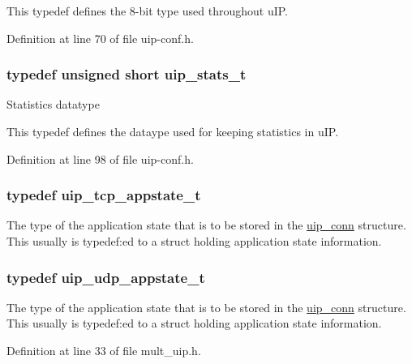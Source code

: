 This typedef defines the 8-\/bit type used throughout uIP. 

Definition at line 70 of file uip-\/conf.h.

\hypertarget{group__uipfw_ga727459e5c4f777543c81ffffa3df3f0c}{
\subsubsection[{uip\_\-stats\_\-t}]{\setlength{\rightskip}{0pt plus 5cm}typedef unsigned short {\bf uip\_\-stats\_\-t}}}
\label{group__uipfw_ga727459e5c4f777543c81ffffa3df3f0c}
Statistics datatype

This typedef defines the dataype used for keeping statistics in uIP. 

Definition at line 98 of file uip-\/conf.h.

\hypertarget{group__uipopt_ga69646a81a922033c5281445a71f8ffed}{
\subsubsection[{uip\_\-tcp\_\-appstate\_\-t}]{\setlength{\rightskip}{0pt plus 5cm}typedef {\bf uip\_\-tcp\_\-appstate\_\-t}}}
\label{group__uipopt_ga69646a81a922033c5281445a71f8ffed}
The type of the application state that is to be stored in the \hyperlink{structuip__conn}{uip\_\-conn} structure. This usually is typedef:ed to a struct holding application state information. \hypertarget{group__uipopt_gaa92afb113e122f860392bfbd385f842e}{
\subsubsection[{uip\_\-udp\_\-appstate\_\-t}]{\setlength{\rightskip}{0pt plus 5cm}typedef {\bf uip\_\-udp\_\-appstate\_\-t}}}
\label{group__uipopt_gaa92afb113e122f860392bfbd385f842e}
The type of the application state that is to be stored in the \hyperlink{structuip__conn}{uip\_\-conn} structure. This usually is typedef:ed to a struct holding application state information. 

Definition at line 33 of file mult\_\-uip.h.



